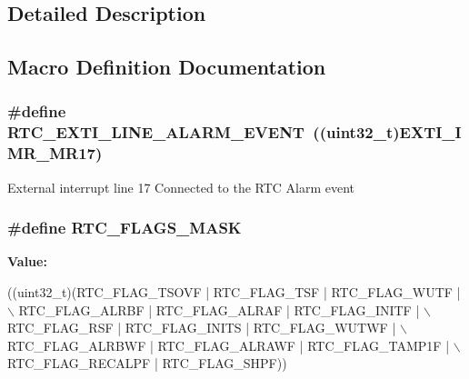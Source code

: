 \subsection{Detailed Description}


\subsection{Macro Definition Documentation}
\subsubsection[{\texorpdfstring{R\+T\+C\+\_\+\+E\+X\+T\+I\+\_\+\+L\+I\+N\+E\+\_\+\+A\+L\+A\+R\+M\+\_\+\+E\+V\+E\+NT}{RTC_EXTI_LINE_ALARM_EVENT}}]{\setlength{\rightskip}{0pt plus 5cm}\#define R\+T\+C\+\_\+\+E\+X\+T\+I\+\_\+\+L\+I\+N\+E\+\_\+\+A\+L\+A\+R\+M\+\_\+\+E\+V\+E\+NT~((uint32\+\_\+t){\bf E\+X\+T\+I\+\_\+\+I\+M\+R\+\_\+\+M\+R17})}\hypertarget{group___r_t_c___private___constants_gaeffe9b89372b06df1c0eff2f4346682b}{}\label{group___r_t_c___private___constants_gaeffe9b89372b06df1c0eff2f4346682b}
External interrupt line 17 Connected to the R\+TC Alarm event 
\subsubsection[{\texorpdfstring{R\+T\+C\+\_\+\+F\+L\+A\+G\+S\+\_\+\+M\+A\+SK}{RTC_FLAGS_MASK}}]{\setlength{\rightskip}{0pt plus 5cm}\#define R\+T\+C\+\_\+\+F\+L\+A\+G\+S\+\_\+\+M\+A\+SK}\hypertarget{group___r_t_c___private___constants_ga0c7513e50528d7b5a52e88340a4e7b25}{}\label{group___r_t_c___private___constants_ga0c7513e50528d7b5a52e88340a4e7b25}
{\bfseries Value\+:}
\begin{DoxyCode}
((uint32\_t)(RTC\_FLAG\_TSOVF | RTC\_FLAG\_TSF | RTC\_FLAG\_WUTF | \(\backslash\)
                                            RTC\_FLAG\_ALRBF | RTC\_FLAG\_ALRAF | RTC\_FLAG\_INITF | \(\backslash\)
                                            RTC\_FLAG\_RSF | RTC\_FLAG\_INITS | RTC\_FLAG\_WUTWF | \(\backslash\)
                                            RTC\_FLAG\_ALRBWF | RTC\_FLAG\_ALRAWF | RTC\_FLAG\_TAMP1F | \(\backslash\)
                                            RTC\_FLAG\_RECALPF | RTC\_FLAG\_SHPF))
\end{DoxyCode}
